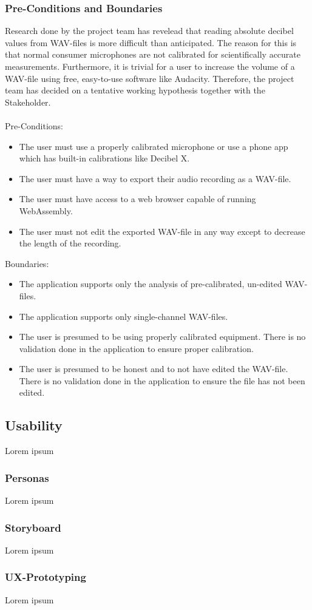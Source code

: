 \subsubsection{Pre-Conditions and Boundaries}
Research done by the project team has revelead that reading absolute decibel values from WAV-files is more difficult than anticipated.
The reason for this is that normal consumer microphones are not calibrated for scientifically accurate measurements\cite{stackoverflow_spl}. Furthermore, it is trivial for a user
to increase the volume of a WAV-file using free, easy-to-use software like Audacity\cite{audacity}\cite{audacity_amplify}. Therefore, the project team has decided 
on a tentative working hypothesis together with the Stakeholder. \\ \\
Pre-Conditions:
\begin{itemize}
    \item The user must use a properly calibrated microphone or use a phone app which has built-in calibrations like Decibel X\cite{decibelx_ios}\cite{decibelx_android}.
    \item The user must have a way to export their audio recording as a WAV-file.
    \item The user must have access to a web browser capable of running WebAssembly.
    \item The user must not edit the exported WAV-file in any way except to decrease the length of the recording.
\end{itemize}
Boundaries:
\begin{itemize}
    \item The application supports only the analysis of pre-calibrated, un-edited WAV-files.
    \item The application supports only single-channel WAV-files.
    \item The user is presumed to be using properly calibrated equipment. There is no validation done in the application to ensure proper calibration.
    \item The user is presumed to be honest and to not have edited the WAV-file. There is no validation done in the application to ensure the file has not been edited.
\end{itemize}

\subsection{Usability}
Lorem ipsum

\subsubsection{Personas}
Lorem ipsum

\subsubsection{Storyboard}
Lorem ipsum

\subsubsection{UX-Prototyping}
Lorem ipsum